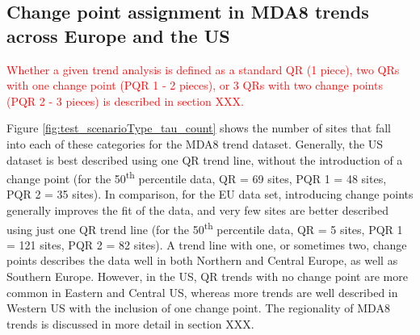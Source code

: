 \documentclass[journal abbreviation, manuscript]{copernicus}
\begin{document}


\subsection{Change point assignment in MDA8 trends across Europe and the US} \label{sect:new_mda8_piecewise_types}

\textcolor{red}{Whether a given trend analysis is defined as a standard QR (1 piece), two QRs with one change point (PQR 1 - 2 pieces), or 3 QRs with two change points (PQR 2 - 3 pieces) is described in section XXX.}

Figure \ref{fig:test_scenarioType_tau_count} shows the number of sites that fall into each of these categories for the MDA8 trend dataset. Generally, the US dataset is best described using one QR trend line, without the introduction of a change point (for the 50\textsuperscript{th} percentile data, QR = 69 sites, PQR 1 = 48 sites, PQR 2 = 35 sites). In comparison, for the EU data set, introducing change points generally improves the fit of the data, and very few sites are better described using just one QR trend line (for the 50\textsuperscript{th} percentile data, QR = 5 sites, PQR 1 = 121 sites, PQR 2 = 82 sites). A trend line with one, or sometimes two, change points describes the data well in both Northern and Central Europe, as well as Southern Europe. However, in the US, QR trends with no change point are more common in Eastern and Central US, whereas more trends are well described in Western US with the inclusion of one change point. The regionality of MDA8 trends is discussed in more detail in section XXX.
 \clearpage
 
\end{document}
